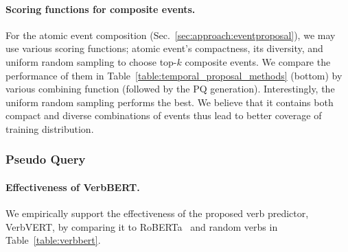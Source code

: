 \vspace{-1em}\paragraph{Scoring functions for composite events.} %
For the atomic event composition (Sec.~\ref{sec:approach:eventproposal}), we may use various scoring functions; atomic event's compactness, its diversity, and uniform random sampling to choose top-$k$ composite events.
We compare the performance of them in Table~\ref{table:temporal_proposal_methods} (bottom) by various combining function (followed by the PQ generation).
Interestingly, the uniform random sampling performs the best.
We believe that it contains both compact and diverse combinations of events thus lead to better coverage of training distribution.



\vspace{-0.5em}\subsubsection{Pseudo Query}
\label{sec:pseudo_query_exp}

\vspace{-0.5em}\paragraph{Effectiveness of VerbBERT.} %
We empirically support the effectiveness of the proposed verb predictor, VerbVERT, by comparing it to RoBERTa~\cite{roberta} and random verbs in Table~\ref{table:verbbert}.

